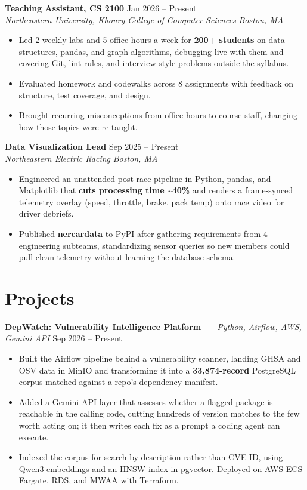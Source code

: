 \documentclass[letterpaper,10pt]{article}
\newcommand{\entrysize}{\fontsize{10.5}{12}\selectfont}
\newif\ifentrygap
\newcommand{\entrygapsize}{6.4pt}
\newcommand{\entryfirstgap}{0.4pt}
\newcommand{\entrysep}{\ifentrygap\vspace{\entrygapsize}\else\vspace{\entryfirstgap}\fi\global\entrygaptrue}
\let\entryorigsection\section
\renewcommand{\section}{\global\entrygapfalse\entryorigsection}
\newcommand{\entry}[4]{\entrysep{\entrysize\textbf{#1}} \hfill #2 \\ \textit{#3} \hfill \textit{#4}}
\newcommand{\project}[3]{\entrysep{\entrysize\textbf{#1}} \ $\vert$ \ \textit{#2} \hfill #3}
\begin{document}
\entry{Teaching Assistant, CS 2100}{Jan 2026 -- Present}
      {Northeastern University, Khoury College of Computer Sciences}{Boston, MA}
\begin{itemize}
  \item Led 2 weekly labs and 5 office hours a week for \textbf{200+ students} on data structures, pandas, and graph algorithms,
        debugging live with them and covering Git, lint rules, and interview-style problems outside the syllabus.
  \item Evaluated homework and codewalks across 8 assignments with feedback on structure, test coverage, and design.
  \item Brought recurring misconceptions from office hours to course staff, changing how those topics were re-taught.
\end{itemize}

\entry{Data Visualization Lead}{Sep 2025 -- Present}
      {Northeastern Electric Racing}{Boston, MA}
\begin{itemize}
  \item Engineered an unattended post-race pipeline in Python, pandas, and Matplotlib that \textbf{cuts processing time
        \textasciitilde40\%} and renders a frame-synced telemetry overlay (speed, throttle, brake, pack temp) onto race video for driver debriefs.
  \item Published \textbf{nercardata} to PyPI after gathering requirements from 4 engineering subteams,
        standardizing sensor queries so new members could pull clean telemetry without learning the database schema.
\end{itemize}

\section{Projects}

\project{DepWatch: Vulnerability Intelligence Platform}{Python, Airflow, AWS, Gemini API}{Sep 2026 -- Present}
\begin{itemize}
  \item Built the Airflow pipeline behind a vulnerability scanner, landing GHSA and OSV data in MinIO and
        transforming it into a \textbf{33,874-record} PostgreSQL corpus matched against a repo's dependency manifest.
  \item Added a Gemini API layer that assesses whether a flagged package is reachable in the calling code, cutting
        hundreds of version matches to the few worth acting on; it then writes each fix as a prompt a coding agent can execute.
  \item Indexed the corpus for search by description rather than CVE ID, using Qwen3 embeddings and an HNSW index in
        pgvector. Deployed on AWS ECS Fargate, RDS, and MWAA with Terraform.
\end{itemize}
\end{document}

